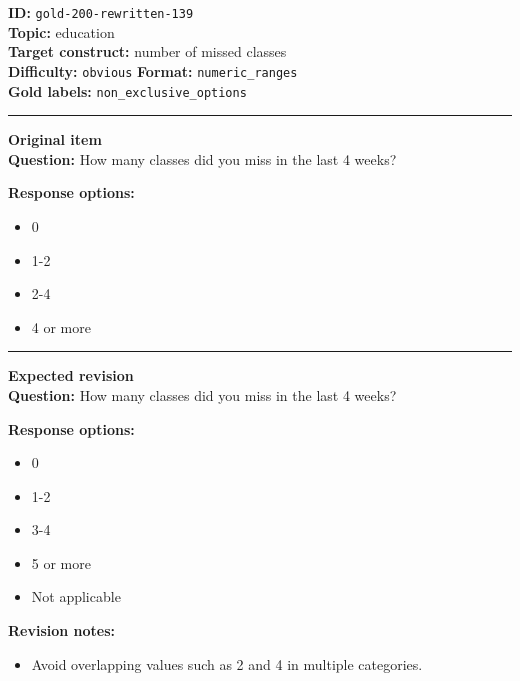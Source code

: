 \documentclass[10pt,a4paper]{article}
\newcommand{\sectionline}{\vspace{0.15em}\hrule\vspace{0.35em}}
\begin{document}
\begin{tcolorbox}[colframe=FlawRed,colback=white,colbacktitle=FlawRed!9,coltitle=black,title={Item 139\hfill Flawed item}]
\textbf{ID:} \texttt{gold-200-rewritten-139}\\
\textbf{Topic:} education\\
\textbf{Target construct:} number of missed classes\\
\textbf{Difficulty:} \texttt{obvious} \quad \textbf{Format:} \texttt{numeric\_ranges}\\
\textbf{Gold labels:} \texttt{non\_exclusive\_options}\\
\sectionline
\textbf{Original item}\\
\textbf{Question:} How many classes did you miss in the last 4 weeks?
\par\textbf{Response options:}
\begin{itemize}
\item 0
\item 1-2
\item 2-4
\item 4 or more
\end{itemize}
\sectionline
\textbf{Expected revision}\\
\textbf{Question:} How many classes did you miss in the last 4 weeks?
\par\textbf{Response options:}
\begin{itemize}
\item 0
\item 1-2
\item 3-4
\item 5 or more
\item Not applicable
\end{itemize}
\par\textbf{Revision notes:}
\begin{itemize}
\item Avoid overlapping values such as 2 and 4 in multiple categories.
\end{itemize}
\end{tcolorbox}
\end{document}
